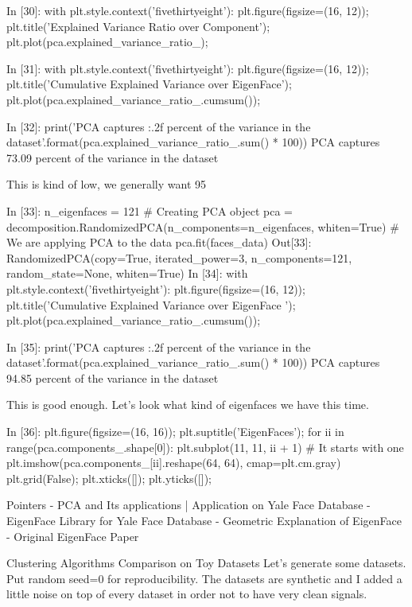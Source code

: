 In [30]:
with plt.style.context('fivethirtyeight'):
    plt.figure(figsize=(16, 12));
    plt.title('Explained Variance Ratio over Component');
    plt.plot(pca.explained_variance_ratio_);

In [31]:
with plt.style.context('fivethirtyeight'):
    plt.figure(figsize=(16, 12));
    plt.title('Cumulative Explained Variance over EigenFace');
    plt.plot(pca.explained_variance_ratio_.cumsum());

In [32]:
print('PCA captures {:.2f} percent of the variance in the dataset'.format(pca.explained_variance_ratio_.sum() * 100))
PCA captures 73.09 percent of the variance in the dataset

This is kind of low, we generally want 95%

In [33]:
n_eigenfaces = 121
# Creating PCA object
pca = decomposition.RandomizedPCA(n_components=n_eigenfaces, whiten=True)
# We are applying PCA to the data
pca.fit(faces_data)
Out[33]:
RandomizedPCA(copy=True, iterated_power=3, n_components=121,
       random_state=None, whiten=True)
In [34]:
with plt.style.context('fivethirtyeight'):
    plt.figure(figsize=(16, 12));
    plt.title('Cumulative Explained Variance over EigenFace ');
    plt.plot(pca.explained_variance_ratio_.cumsum());

In [35]:
print('PCA captures {:.2f} percent of the variance in the dataset'.format(pca.explained_variance_ratio_.sum() * 100))
PCA captures 94.85 percent of the variance in the dataset

This is good enough. Let's look what kind of eigenfaces we have this time.

In [36]:
plt.figure(figsize=(16, 16));
plt.suptitle('EigenFaces');
for ii in range(pca.components_.shape[0]):
    plt.subplot(11, 11, ii + 1) # It starts with one
    plt.imshow(pca.components_[ii].reshape(64, 64), cmap=plt.cm.gray)
    plt.grid(False);
    plt.xticks([]);
    plt.yticks([]);

Pointers
- PCA and Its applications | Application on Yale Face Database - EigenFace Library for Yale Face Database - Geometric Explanation of EigenFace - Original EigenFace Paper

Clustering Algorithms Comparison on Toy Datasets
Let's generate some datasets. Put random seed=0 for reproducibility. The datasets are synthetic and I added a little noise on top of every dataset in order not to have very clean signals.

